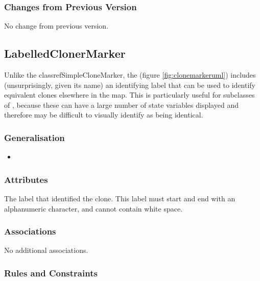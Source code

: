 \subsubsection{Changes from Previous Version}

No change from previous version.


\subsection{LabelledClonerMarker}
\label{defn:LabelledCloneMarker}

Unlike the classref{SimpleCloneMarker}, the
 (figure \ref{fig:clonemarkeruml})
includes (unsurprisingly, given its name) an identifying label that
can be used to identify equivalent clones elsewhere in the map.  This
is particularly useful for subclasses of ,
because these can have a large number of state variables displayed and
therefore may be difficult to visually identify as being identical.

\subsubsection{Generalisation}

\begin{itemize}
\item {}
\end{itemize}

\subsubsection{Attributes}

\begin{attributes}
   The label that identified the clone. This
  label must start and end with an alphanumeric character, and cannot
  contain white space.
\end{attributes}

\subsubsection{Associations}

No additional associations.

\subsubsection{Rules and Constraints}

